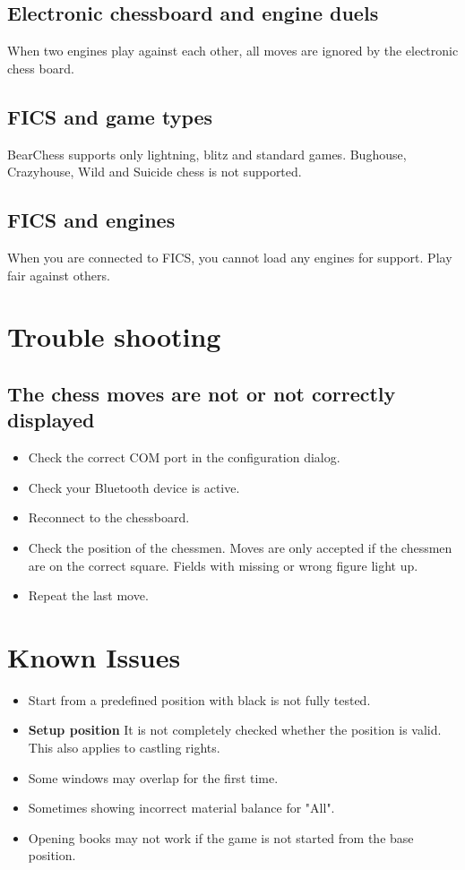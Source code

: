 \documentclass[11pt,a4paper]{article}
\begin{document}
\subsection{Electronic chessboard and engine duels}
When two engines play against each other, all moves are ignored by the electronic chess board.


\subsection{FICS and game types}
BearChess supports only lightning, blitz and standard games. Bughouse, Crazyhouse, Wild and Suicide chess is not supported.

\subsection{FICS and engines}
When you are connected to FICS, you cannot load any engines for support. Play fair against others.


\section{Trouble shooting}

\subsection{The chess moves are not or not correctly displayed}
\begin{itemize}
	\item Check the correct COM port in the configuration dialog.
	\item Check your Bluetooth device is active.	
	\item Reconnect to the chessboard.	
	\item Check the position of the chessmen. Moves are only accepted if the chessmen are on the correct square. Fields with missing or wrong figure light up.
	\item Repeat the last move.
\end{itemize}


\section{Known Issues}
\begin{itemize}
	\item Start from a predefined position with black is not fully tested.
    \item \textbf{Setup position} It is not completely checked whether the position is valid. This also applies to castling rights.
	\item Some windows may overlap for the first time.
	\item Sometimes showing incorrect material balance for "All".
	\item Opening books may not work if the game is not started from the base position.	
\end{itemize}
\end{document}

